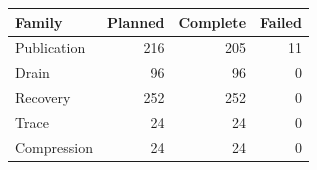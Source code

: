 \begin{tabular}{lrrr}
\toprule
Family & Planned & Complete & Failed\\
\midrule
Publication & 216 & 205 & 11\\
Drain & 96 & 96 & 0\\
Recovery & 252 & 252 & 0\\
Trace & 24 & 24 & 0\\
Compression & 24 & 24 & 0\\
\bottomrule
\end{tabular}
